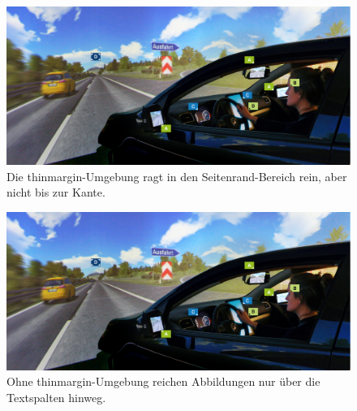 \begin{figure}[t]%
\begin{thinmargin} %
\includegraphics[width=\columnwidth]{content/caudri/images/ifab-sim1a}%

\caption{Die thinmargin-Umgebung ragt in den Seitenrand-Bereich rein, aber nicht bis zur Kante. }%
\end{thinmargin} %
\end{figure}


\blindtext

\begin{figure}[t]%
\includegraphics[width=\textwidth]{content/caudri/images/ifab-sim1a}%
\caption{Ohne thinmargin-Umgebung reichen Abbildungen nur über die Textspalten hinweg.}%
\end{figure}



\Blindtext


